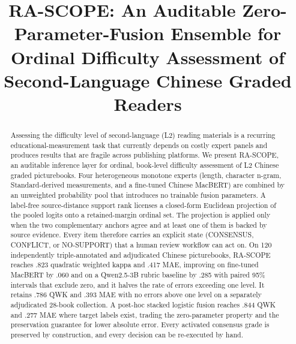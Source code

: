 \documentclass[conference]{IEEEtran}
\begin{document}
\title{RA-SCOPE: An Auditable Zero-Parameter-Fusion Ensemble for Ordinal
Difficulty Assessment of Second-Language Chinese Graded Readers}

\author{
}

\maketitle

\begin{abstract}
Assessing the difficulty level of second-language (L2) reading materials is a
recurring educational-measurement task that currently depends on costly expert
panels and produces results that are fragile across publishing platforms. We
present RA-SCOPE, an auditable inference layer for ordinal, book-level
difficulty assessment of L2 Chinese graded picturebooks. Four heterogeneous
monotone experts (length, character n-gram, Standard-derived measurements, and a
fine-tuned Chinese MacBERT) are combined by an unweighted probability pool that
introduces no trainable fusion parameters. A label-free source-distance support
rank licenses a closed-form Euclidean projection of the pooled logits onto a
retained-margin ordinal set. The projection is applied only when the two
complementary anchors agree and at least one of them is backed by source
evidence. Every item therefore carries an explicit state (CONSENSUS, CONFLICT,
or NO-SUPPORT) that a human review workflow can act on. On 120 independently
triple-annotated and adjudicated Chinese picturebooks, RA-SCOPE reaches .823
quadratic weighted kappa and .417 MAE, improving on fine-tuned MacBERT by .060
and on a Qwen2.5-3B rubric baseline by .285 with paired 95\% intervals that
exclude zero, and it halves the rate of errors exceeding one level. It retains
.786 QWK and .393 MAE with no errors above one level on a separately
adjudicated 28-book collection. A post-hoc stacked logistic fusion reaches .844
QWK and .277 MAE where target labels exist, trading the zero-parameter property
and the preservation guarantee for lower absolute error. Every activated
consensus grade is preserved by construction, and every decision can be
re-executed by hand.
\end{abstract}
\end{document}
